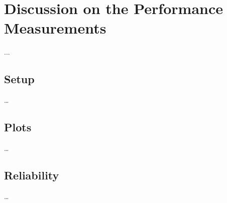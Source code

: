 
\section{Discussion on the Performance Measurements}
...

\subsection{Setup}
\dots

\subsection{Plots}
\dots

\subsection{Reliability}
\dots
